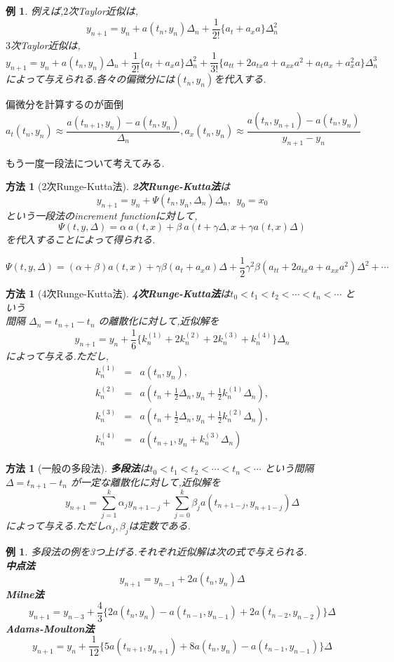 \documentclass[dvipdfmx,cjk]{beamer}
\numberwithin{equation}{section}
\newtheorem{Ex}      [Thm]{例}
\newtheorem{Method}[Thm]{方法}
\def\method{\begin{Method}}
\def\methodx{\end{Method}}
\def\ex{\begin{Ex}}
\def\exx{\end{Ex}}
\def\eq{\begin{equation}}
\def\eqx{\end{equation}}
\def\eqa{\begin{eqnarray}}
\def\eqax{\end{eqnarray}}
\begin{document}
\begin{frame}
\ex
例えば,$2$次Taylor近似は,
\eq
y_{n+1} = y_n + a(t_n,y_n)\Delta_n + \frac{1}{2!}\{ a_t + a_x a \} \Delta_n^2
\eqx
$3$次Taylor近似は,
\eq
y_{n+1} = y_n + a(t_n,y_n)\Delta_n + \frac{1}{2!}\{ a_t + a_x a \} \Delta_n^2
+\frac{1}{3!}\{ a_{tt} + 2a_{tx}a + a_{xx}a^2 + a_ta_x +a_x^2 a \} \Delta_n^3
\eqx
によって与えられる.各々の偏微分には$(t_n,y_n)$を代入する.
\exx
\end{frame}


\begin{frame}
偏微分を計算するのが面倒
\eq
a_t(t_n,y_n) \approx \frac{a(t_{n+1},y_n) - a(t_n,y_n)}{\Delta_n},
a_x(t_n,y_n) \approx \frac{a(t_n,y_{n+1}) - a(t_n,y_n)}{y_{n+1} -y_n}
\eqx
\end{frame}

\begin{frame}
もう一度一段法について考えてみる.\method[2次Runge-Kutta法]
{\bf 2次Runge-Kutta法}は 
\eq
y_{n+1} = y_n + \Psi(t_n,y_n,\Delta_n) \Delta_n,\  \  y_0 = x_0
\eqx
という一段法のincrement functionに対して,
\eq
\Psi(t,y,\Delta) = \alpha \: a(t,x) + \beta \: a(t+\gamma \Delta, x + \gamma a(t,x) \Delta)
\eqx
を代入することによって得られる.\pause
\methodx
\[
\Psi(t,y,\Delta) = (\alpha + \beta)a(t,x) + \gamma \beta(a_t + a_x a )\Delta
+ \frac{1}{2}  \gamma^2 \beta (a_{tt} + 2a_{tx}a + a_{xx}a^2)\Delta^2 + \cdots
\]
\end{frame}
\begin{frame}
\method[4次Runge-Kutta法]
{\bf 4次Runge-Kutta法}は$ t_0 < t_1 < t_2 < \cdots < t_n < \cdots $ という\\
間隔 $\Delta_n = t_{n+1} - t_{n}$ の離散化に対して,近似解を
\eq
y_{n+1} = y_n + \frac{1}{6} \{ k_n^{(1)} +
2k_n^{(2)}+ 2k_n^{(3)} +  k_n^{(4)} \} \Delta_n
\eqx
によって与える.ただし,
\eqa
 k_n^{(1)} &=&  a(t_n,y_n),\\
 k_n^{(2)} &=&  a\left(t_n+ \frac{1}{2} \Delta_n ,y_n + \frac{1}{2} k_n^{(1)} \Delta_n\right),\\
 k_n^{(3)} &=&  a\left(t_n+ \frac{1}{2} \Delta_n ,y_n + \frac{1}{2} k_n^{(2)} \Delta_n\right),\\
 k_n^{(4)} &=&  a\left(t_{n+1} ,y_n + k_n^{(3)} \Delta_n\right)
\eqax
\methodx
\end{frame}
\begin{frame}
\method[一般の多段法]
{\bf 多段法}は$ t_0 < t_1 < t_2 < \cdots < t_n < \cdots $ という間隔 $\Delta = t_{n+1} - t_{n}$ が一定な離散化に対して,近似解を
\eq
\label{eq29}
y_{n+1} = \sum_{j=1}^k \alpha_j y_{n+1-j}
+ \sum_{j=0}^k \beta_j a(t_{n+1-j},y_{n+1-j})\Delta
\eqx
によって与える.ただし$\alpha_j,\beta_j$は定数である.
\methodx
\end{frame}
\begin{frame}
\ex
多段法の例を3つ上げる.それぞれ近似解は次の式で与えられる.\\
\bf{中点法}
\eq y_{n+1} = y_{n-1} + 2a(t_n,y_n)\Delta \eqx
\bf{Milne法}
\eq y_{n+1} = y_{n-3} + \frac{4}{3}\{ 2a(t_n,y_n)- a(t_{n-1},y_{n-1}) + 2 a(t_{n-2},y_{n-2})\} \Delta \eqx
\bf{Adams-Moulton法}
\eq y_{n+1} = y_{n} + \frac{1}{12}\{ 5a(t_{n+1},y_{n+1})+ 8a(t_{n},y_{n}) - a(t_{n-1},y_{n-1})\} \Delta \eqx

\exx
\end{frame}
\end{document}
